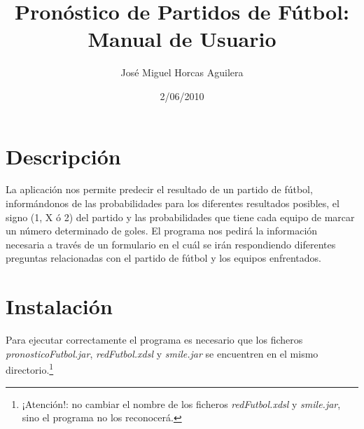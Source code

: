 \documentclass[a4paper,12pt]{article}
\title{Pronóstico de Partidos de Fútbol:\\Manual de Usuario}
\author{José Miguel Horcas Aguilera}
\date{2/06/2010}
\begin{document}
\renewcommand{\figurename}{Figura}
\maketitle
\tableofcontents
\newpage

\section{Descripción}
\label{sec:Descripción}
La aplicación nos permite predecir el resultado de un partido de fútbol,
informándonos de las probabilidades para los diferentes resultados posibles, el signo (1, X ó 2) del partido y las probabilidades que tiene cada equipo de marcar un número determinado de goles.
El programa nos pedirá la información necesaria a través de un formulario en el cuál se irán respondiendo diferentes preguntas relacionadas con el partido de fútbol y los equipos enfrentados.
\section{Instalación}
\label{sec:instalacion}
\par
Para ejecutar correctamente el programa es necesario que los ficheros
\textit{pronosticoFutbol.jar}, \textit{redFutbol.xdsl} y \textit{smile.jar} se encuentren en el mismo directorio.\footnote{¡Atención!: no cambiar el nombre de los ficheros \textit{redFutbol.xdsl} y \textit{smile.jar}, sino el programa no los reconocerá.}
\end{document}
